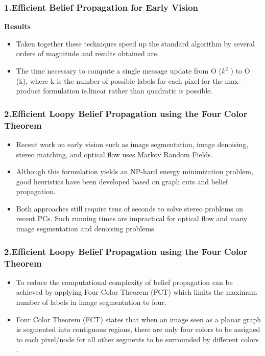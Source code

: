 \documentclass{beamer}
\begin{document}
\begin{frame}
\frametitle{\textbf{1.Efficient Belief Propagation for Early Vision}}
\textbf{Results }
\begin{itemize}
\item Taken together these techniques speed up the standard algorithm by several orders of magnitude and results obtained are.
\item The time necessary to compute a single message update from O ($k^2$ ) to O (k), where k is the number of possible labels for each pixel for the max-product formulation ie.linear rather than quadratic is possible.

\end{itemize}
\end{frame}



\begin{frame}
\frametitle{\textbf{2.Efficient Loopy Belief Propagation using the Four Color Theorem}}
\begin{itemize}
\item Recent work on early vision such as image segmentation, image  denoising, stereo matching, and optical flow uses Markov Random Fields.
\item  Although this formulation yields an NP-hard energy minimization problem, good heuristics have been developed based on graph cuts and belief propagation.
\item  Both approaches still require tens of seconds to solve stereo problems on recent PCs. Such running times are impractical for optical flow and many image segmentation and
denoising problems
\end{itemize}
\end{frame}

\begin{frame}
\frametitle{\textbf{2.Efficient Loopy Belief Propagation using the Four Color Theorem}}
\begin{itemize}
\item To reduce the computational complexity of belief propagation  can be achieved by applying  Four Color Theorem (FCT) which  limits  the maximum number of labels in  image segmentation to four.
\item  Four Color Theorem (FCT) states that   when an image seen as a planar graph is segmented into contiguous regions, there
are only four colors to be assigned to each pixel/node for all  other segments to be
surrounded by different colors .
\end{itemize}
\end{frame}
\end{document}
